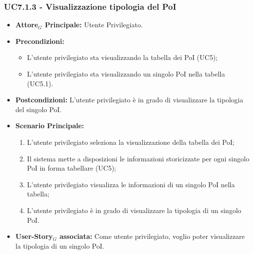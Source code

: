 \documentclass[11pt]{article}
\begin{document}
\begin{justify}
\subsubsection{\textbf{UC7.1.3 - Visualizzazione tipologia del PoI}}
\label{UC7.1.3}
\begin{itemize}
    \item \textbf{Attore$_G$ Principale:} Utente Privilegiato.
    \item \textbf{Precondizioni:} 
        \begin{itemize}
          \item L'utente privilegiato sta visualizzando la tabella dei PoI (UC5);
            \item L'utente privilegiato sta visualizzando un singolo PoI nella tabella (UC5.1).
        \end{itemize}
      \item \textbf{Postcondizioni:} L'utente privilegiato è in grado di visualizzare la tipologia del singolo PoI.
    \item \textbf{Scenario Principale:} 
        \begin{enumerate}
        \item L'utente privilegiato seleziona la visualizzazione della tabella dei PoI;
          \item Il sistema mette a disposizioni le informazioni storicizzate per ogni singolo PoI in forma tabellare (UC5);
          \item L'utente privilegiato visualizza le informazioni di un singolo PoI nella tabella;
            \item L'utente privilegiato è in grado di visualizzare la tipologia di un singolo PoI.
        \end{enumerate}
    \item \textbf{User-Story$_G$ associata:} Come utente privilegiato, voglio poter visualizzare la tipologia di un singolo PoI.
\end{itemize}

\end{justify}
\end{document}
